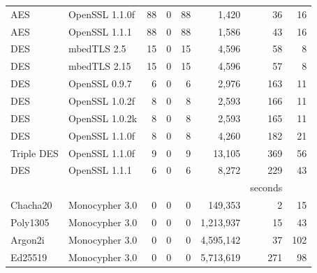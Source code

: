 \begin{table}[]
\begin{tabular}{llrrrrrr}
    AES                & OpenSSL 1.1.0f           & 88                & 0                 & 88             & 1,420       & 36      & 16    \\
    AES                & OpenSSL 1.1.1            & 88                & 0                 & 88             & 1,586       & 43      & 16    \\
    DES                & mbedTLS 2.5              & 15                & 0                 & 15             & 4,596       & 58      & 8     \\
    DES                & mbedTLS 2.15             & 15                & 0                 & 15             & 4,596       & 57      & 8     \\
    DES                & OpenSSL 0.9.7            & 6                 & 0                 & 6              & 2,976       & 163     & 11    \\
    DES                & OpenSSL 1.0.2f           & 8                 & 0                 & 8              & 2,593       & 166     & 11    \\
    DES                & OpenSSL 1.0.2k           & 8                 & 0                 & 8              & 2,593       & 165     & 11    \\
    DES                & OpenSSL 1.1.0f           & 8                 & 0                 & 8              & 4,260       & 182     & 21    \\
    Triple DES         & OpenSSL 1.1.0f &  9 &0  &9   &13,105   & 369 & 56\\
    DES                & OpenSSL 1.1.1            & 6                 & 0                 & 6              & 8,272       & 229     & 43    \\
                       &                          &                   &                   &                &             & seconds         \\\cline{7-7}
    Chacha20           & Monocypher 3.0           & 0                 & 0                 & 0              & 149,353     & 2       & 15    \\
    Poly1305           & Monocypher 3.0           & 0                 & 0                 & 0              & 1,213,937   & 15      & 43    \\
    Argon2i            & Monocypher 3.0           & 0                 & 0                 & 0              & 4,595,142   & 37      & 102   \\
    Ed25519            & Monocypher 3.0           & 0                 & 0                 & 0              & 5,713,619   & 271     & 98    \\

\end{tabular}
\end{table}
